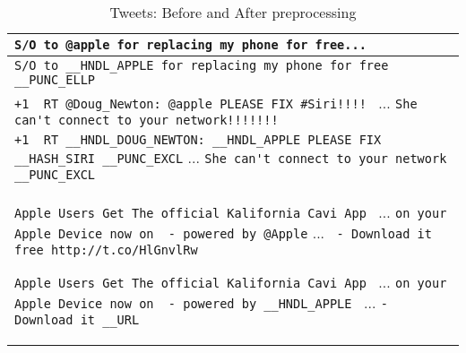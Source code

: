 \begin{table}[h]
\centering
	\begin{tabular}{|p{}|}
		\verb'S/O to @apple for replacing my phone for free...'
		\\ \hline
		\verb'S/O to __HNDL_APPLE for replacing my phone for free __PUNC_ELLP'
		\\ \hline

		\verb'+1  RT @Doug_Newton: @apple PLEASE FIX #Siri!!!! '	{...}
		\verb"She can't connect to your network!!!!!!!"
		\\ \hline
		\verb'+1  RT __HNDL_DOUG_NEWTON: __HNDL_APPLE PLEASE FIX __HASH_SIRI __PUNC_EXCL'	{...}
		\verb"She can't connect to your network __PUNC_EXCL "
		\\ \hline

		\verb'Apple Users Get The official Kalifornia Cavi App '	{...}
		\verb'on your Apple Device now on  - powered by @Apple'	{...}
		\verb' - Download it free http://t.co/HlGnvlRw'

		\verb'Apple Users Get The official Kalifornia Cavi App '	{...}
		\verb'on your Apple Device now on  - powered by __HNDL_APPLE '	{...}
		\verb'- Download it __URL'
		\\ \hline

	\end{tabular}

\caption{Tweets: Before and After preprocessing}
\label{table:preproc}
\end{table}
